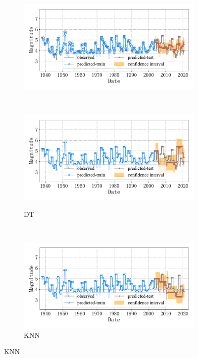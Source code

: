\begin{figure}[!htbp]
\begin{subfigure}[b]{0.45\textwidth}
    \includegraphics[width=\textwidth]{Img/chap5_seism/block6/seism_gbr_minyear_1932_maxyear_2021_spanlat_2_spanlon_4_timewindow_72_nextmonth_12_minmag_3.0_block_6.pdf}
    \vspace{-1cm}
    \label{fig:seism_gbr_minyear_1932_maxyear_2021_spanlat_2_spanlon_4_timewindow_72_nextmonth_12_minmag_3.0_block_6}
  \end{subfigure}
  ~
  \begin{subfigure}[b]{0.45\textwidth}
    \caption{DT}
    \vspace{-0.2cm}
    \includegraphics[width=\textwidth]{Img/chap5_seism/block6/seism_dt_minyear_1932_maxyear_2021_spanlat_2_spanlon_4_timewindow_72_nextmonth_12_minmag_3.0_block_6.pdf}
    \vspace{-1cm}
    \label{fig:seism_dt_minyear_1932_maxyear_2021_spanlat_2_spanlon_4_timewindow_72_nextmonth_12_minmag_3.0_block_6}
  \end{subfigure}
  \\
  \begin{subfigure}[b]{0.45\textwidth}
    \caption{KNN}
    \vspace{-0.2cm}
    \includegraphics[width=\textwidth]{Img/chap5_seism/block6/seism_kn_minyear_1932_maxyear_2021_spanlat_2_spanlon_4_timewindow_72_nextmonth_12_minmag_3.0_block_6.pdf}

\end{subfigure}
\end{figure}
